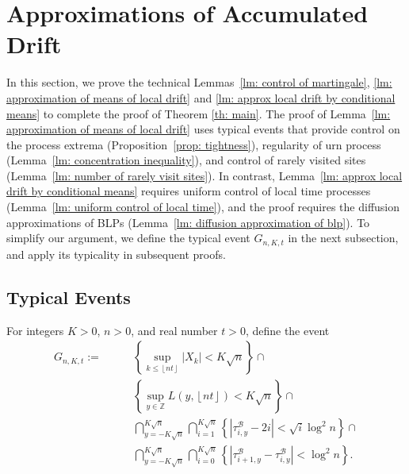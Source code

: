 \documentclass[EJP]{ejpecp} %
\begin{document}
\section{Approximations of Accumulated Drift}\label{sec: approximations}

In this section, we prove the technical Lemmas~\ref{lm: control of martingale}, \ref{lm: approximation of means of local drift} and \ref{lm: approx local drift by conditional means} to complete  the proof of Theorem \ref{th: main}. 
The proof of Lemma~\ref{lm: approximation of means of local drift} uses typical events that provide control on the process extrema (Proposition~\ref{prop: tightness}), regularity of urn process (Lemma~\ref{lm: concentration inequality}), and control of rarely visited sites (Lemma~\ref{lm: number of rarely visit sites}). 
In contrast, Lemma~\ref{lm: approx local drift by conditional means} requires uniform control of local time processes (Lemma~\ref{lm: uniform control of local time}), and the proof requires the diffusion approximations of BLPs (Lemma~\ref{lm: diffusion approximation of blp}).
To simplify our argument, we define the typical event $G_{n, K, t}$ in the next subsection, and apply its typicality in subsequent proofs.

\subsection{Typical Events}

For integers $K>0$, $n > 0$, and real number $t>0$, define the event
\begin{align}
	G_{n,K,t} :=  \qquad
	\label{eq:good-event-1}
	& \left\{\sup _{k \le \left\lfloor nt  \right\rfloor} |X_k| < K \sqrt{n} \right\} \cap \\
	\label{eq:good-event-2}
	& \left\{\sup_{y \in \mathbb{Z}} L(y, \left\lfloor nt  \right\rfloor) < K \sqrt{n} \right\} \cap \\
	\label{eq:good-event-3}
	& \bigcap_{y = - K \sqrt{n} }^{K \sqrt{n}} 
	\bigcap_{i = 1}^{K \sqrt{n} } \left\{\left| \tau_{i,y}^{\mathscr{B}} - 2 i \right| < \sqrt{ i } \log^2 n \right\}  \cap \\
	\label{eq:good-event-4}
	& \bigcap_{y = - K \sqrt{n} }^{K \sqrt{n}} 
	\bigcap_{i = 0}^{K \sqrt{n} } \left\{\left| \tau_{i+1, y}^{\mathscr{B}} - \tau_{i,y}^{\mathscr{B}} \right| < \log^2 n \right\}  
	.\end{align}
\end{document}
